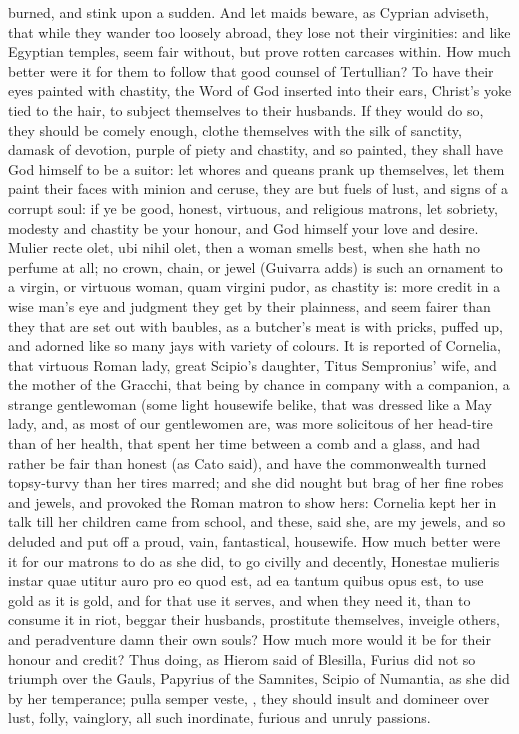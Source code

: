 burned, and stink upon a sudden. And let maids beware, as Cyprian
adviseth, that while they wander too loosely abroad, they lose not
their virginities: and like Egyptian temples, seem fair without, but
prove rotten carcases within. How much better were it for them to
follow that good counsel of Tertullian? To have their eyes
painted with chastity, the Word of God inserted into their ears,
Christ's yoke tied to the hair, to subject themselves to their
husbands. If they would do so, they should be comely enough, clothe
themselves with the silk of sanctity, damask of devotion, purple of
piety and chastity, and so painted, they shall have God himself to be a
suitor: let whores and queans prank up themselves, let them paint
their faces with minion and ceruse, they are but fuels of lust, and
signs of a corrupt soul: if ye be good, honest, virtuous, and religious
matrons, let sobriety, modesty and chastity be your honour, and God
himself your love and desire. Mulier recte olet, ubi nihil olet, then a
woman smells best, when she hath no perfume at all; no crown, chain, or
jewel (Guivarra adds) is such an ornament to a virgin, or virtuous
woman, quam virgini pudor, as chastity is: more credit in a wise man's
eye and judgment they get by their plainness, and seem fairer than they
that are set out with baubles, as a butcher's meat is with pricks,
puffed up, and adorned like so many jays with variety of colours. It is
reported of Cornelia, that virtuous Roman lady, great Scipio's
daughter, Titus Sempronius' wife, and the mother of the Gracchi, that
being by chance in company with a companion, a strange gentlewoman
(some light housewife belike, that was dressed like a May lady, and, as
most of our gentlewomen are, was more solicitous of her head-tire
than of her health, that spent her time between a comb and a glass, and
had rather be fair than honest (as Cato said), and have the
commonwealth turned topsy-turvy than her tires marred; and she did
nought but brag of her fine robes and jewels, and provoked the Roman
matron to show hers: Cornelia kept her in talk till her children came
from school, and these, said she, are my jewels, and so deluded and put
off a proud, vain, fantastical, housewife. How much better were it for
our matrons to do as she did, to go civilly and decently,
Honestae mulieris instar quae utitur auro pro eo quod est, ad ea
tantum quibus opus est, to use gold as it is gold, and for that use it
serves, and when they need it, than to consume it in riot, beggar their
husbands, prostitute themselves, inveigle others, and peradventure damn
their own souls? How much more would it be for their honour and credit?
Thus doing, as Hierom said of Blesilla, Furius did not so triumph
over the Gauls, Papyrius of the Samnites, Scipio of Numantia, as she
did by her temperance; pulla semper veste, \etc{}, they should insult and
domineer over lust, folly, vainglory, all such inordinate, furious and
unruly passions.

